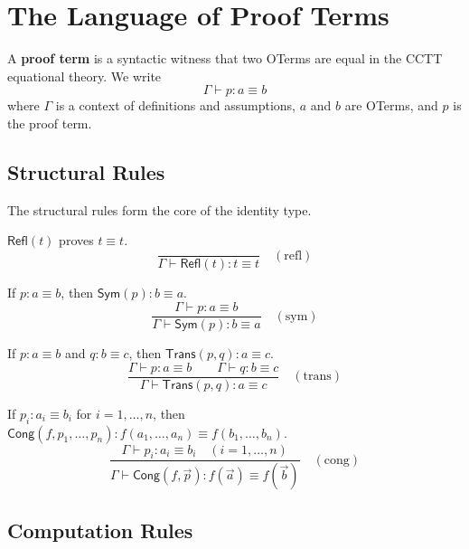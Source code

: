 \section{The Language of Proof Terms}

\begin{definition}
A \textbf{proof term} is a syntactic witness that two OTerms are equal
in the CCTT equational theory.  We write
\[
  \Gamma \vdash p : a \equiv b
\]
where $\Gamma$ is a context of definitions and assumptions, $a$ and $b$
are OTerms, and $p$ is the proof term.
\end{definition}

\subsection{Structural Rules}

The structural rules form the core of the identity type.

\begin{definition}[Reflexivity]
$\mathsf{Refl}(t)$ proves $t \equiv t$.
\[
\frac{}{\Gamma \vdash \mathsf{Refl}(t) : t \equiv t} \quad (\text{refl})
\]
\end{definition}

\begin{definition}[Symmetry]
If $p : a \equiv b$, then $\mathsf{Sym}(p) : b \equiv a$.
\[
\frac{\Gamma \vdash p : a \equiv b}
     {\Gamma \vdash \mathsf{Sym}(p) : b \equiv a} \quad (\text{sym})
\]
\end{definition}

\begin{definition}[Transitivity]
If $p : a \equiv b$ and $q : b \equiv c$, then
$\mathsf{Trans}(p, q) : a \equiv c$.
\[
\frac{\Gamma \vdash p : a \equiv b \qquad \Gamma \vdash q : b \equiv c}
     {\Gamma \vdash \mathsf{Trans}(p, q) : a \equiv c} \quad (\text{trans})
\]
\end{definition}

\begin{definition}[Congruence]
If $p_i : a_i \equiv b_i$ for $i = 1, \ldots, n$, then
$\mathsf{Cong}(f, p_1, \ldots, p_n) : f(a_1,\ldots,a_n) \equiv f(b_1,\ldots,b_n)$.
\[
\frac{\Gamma \vdash p_i : a_i \equiv b_i \quad (i = 1, \ldots, n)}
     {\Gamma \vdash \mathsf{Cong}(f, \vec{p}) : f(\vec{a}) \equiv f(\vec{b})}
     \quad (\text{cong})
\]
\end{definition}

\subsection{Computation Rules}

